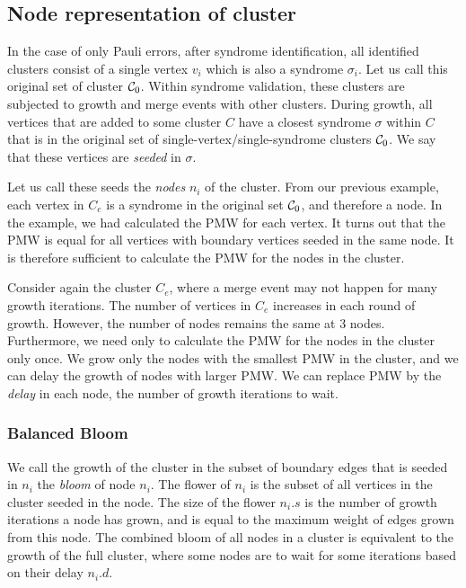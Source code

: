 \subsection{Node representation of cluster}

In the case of only Pauli errors, after syndrome identification, all identified clusters consist of a single vertex $v_i$ which is also a syndrome $\sigma_i$. Let us call this original set of cluster $\mathcal{C}_0$. Within syndrome validation, these clusters are subjected to growth and merge events with other clusters. During growth, all vertices that are added to some cluster $C$ have a closest syndrome $\sigma$ within $C$ that is in the original set of single-vertex/single-syndrome clusters $\mathcal{C}_0$. We say that these vertices are \emph{seeded} in $\sigma$.

Let us call these seeds the \emph{nodes} $n_i$ of the cluster. From our previous example, each vertex in $C_e$ is a syndrome in the original set $\mathcal{C}_0$, and therefore a node. In the example, we had calculated the PMW for each vertex. It turns out that the PMW is equal for all vertices with boundary vertices seeded in the same node. It is therefore sufficient to calculate the PMW for the nodes in the cluster.

Consider again the cluster $C_e$, where a merge event may not happen for many growth iterations. The number of vertices in $C_e$ increases in each round of growth. However, the number of nodes remains the same at 3 nodes. Furthermore, we need only to calculate the PMW for the nodes in the cluster only once. We grow only the nodes with the smallest PMW in the cluster, and we can delay the growth of nodes with larger PMW. We can replace PMW by the \emph{delay} in each node, the number of growth iterations to wait.

\subsubsection{Balanced Bloom}

We call the growth of the cluster in the subset of boundary edges that is seeded in $n_i$ the \emph{bloom} of node $n_i$. The flower of $n_i$ is the subset of all vertices in the cluster seeded in the node. The size of the flower $n_i.s$ is the number of growth iterations a node has grown, and is equal to the maximum weight of edges grown from this node. The combined bloom of all nodes in a cluster is equivalent to the growth of the full cluster, where some nodes are to wait for some iterations based on their delay $n_i.d$. 

